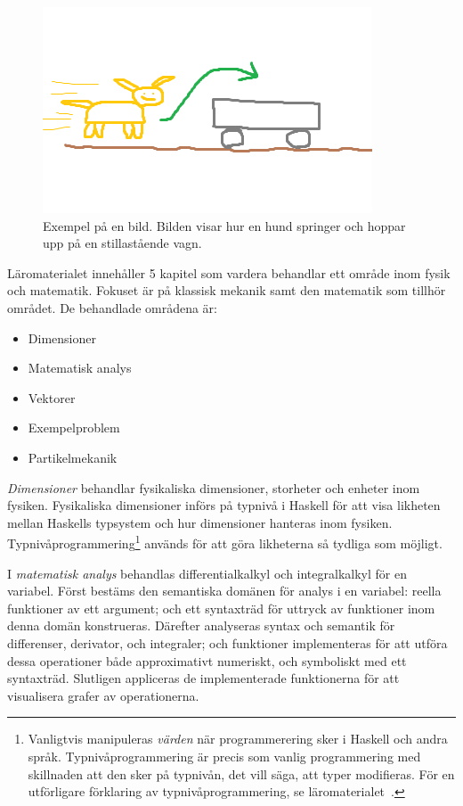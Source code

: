 
\begin{figure}[h]
        \centering
        \includegraphics[width=0.4\linewidth]{figure/smakprov_bild_laromaterial.png}
        \caption{Exempel på en bild. Bilden visar hur en hund springer och hoppar upp på en stillastående vagn.}
        \label{fig:smakprov_bild_laromaterial}
\end{figure}

Läromaterialet innehåller 5 kapitel som vardera behandlar ett område inom fysik
och matematik. Fokuset är på klassisk mekanik samt den matematik som tillhör
området. De behandlade områdena är:

\begin{itemize}
  \item Dimensioner
  \item Matematisk analys
  \item Vektorer
  \item Exempelproblem
  \item Partikelmekanik
\end{itemize}

\textit{Dimensioner} behandlar fysikaliska dimensioner, storheter och enheter inom fysiken.
Fysikaliska dimensioner införs på typnivå i Haskell för att visa likheten mellan
Haskells typsystem och hur dimensioner hanteras inom fysiken.
Typnivåprogrammering\footnote{Vanligtvis manipuleras \textit{värden} när
programmerering sker i Haskell och andra språk. Typnivåprogrammering är precis som
vanlig programmering med skillnaden att den sker på typnivån, det vill säga, att
typer modifieras. För en utförligare förklaring av typnivåprogrammering, se läromaterialet~\cite{LYAP}.} används för att göra likheterna så tydliga som möjligt.

I \textit{matematisk analys} behandlas differentialkalkyl och
integralkalkyl för en variabel. Först bestäms den semantiska domänen
för analys i en variabel: reella funktioner av ett argument; och ett syntaxträd
för uttryck av funktioner inom denna domän konstrueras. Därefter
analyseras syntax och semantik för differenser, derivator, och
integraler; och funktioner implementeras för att utföra dessa
operationer både approximativt numeriskt, och symboliskt med ett
syntaxträd. Slutligen appliceras de implementerade funktionerna för
att visualisera grafer av operationerna.

